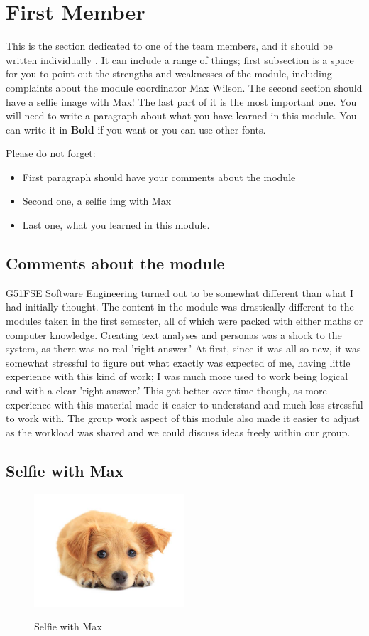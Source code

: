 \section{First Member}
This is the section dedicated to one of the team members, and it should be written individually . It can include a range of things; first subsection is a space for you to point out the strengths and weaknesses of the module, including complaints about the module coordinator Max Wilson. The second section should have a selfie image with Max! The last part of it is the most important one. You will need to write a paragraph about what you have learned in this module. You can write it in \textbf{Bold} if you want or you can use other fonts. 

Please do not forget:
\begin{itemize}
	\item First paragraph should have your comments about the module
	\item Second one, a selfie img with Max
	\item Last one, what you learned in this module.
\end{itemize}

\subsection{Comments about the module}
G51FSE Software Engineering turned out to be somewhat different than what I had initially thought. The content in the module was drastically different to the modules taken in the first semester, all of which were packed with either maths or computer knowledge. Creating text analyses and personas was a shock to the system, as there was no real 'right answer.' At first, since it was all so new, it was somewhat stressful to figure out what exactly was expected of me, having little experience with this kind of work; I was much more used to work being logical and with a clear 'right answer.' This got better over time though, as more experience with this material made it easier to understand and much less stressful to work with. The group work aspect of this module also made it easier to adjust as the workload was shared and we could discuss ideas freely within our group.

\subsection{Selfie with Max}
\begin{figure}[h]
\caption{Selfie with Max}
\centering
\includegraphics[width=0.5\textwidth]{impossibly-cute-puppy-21.jpg}
\label{fig:selfie1}
\end{figure}

